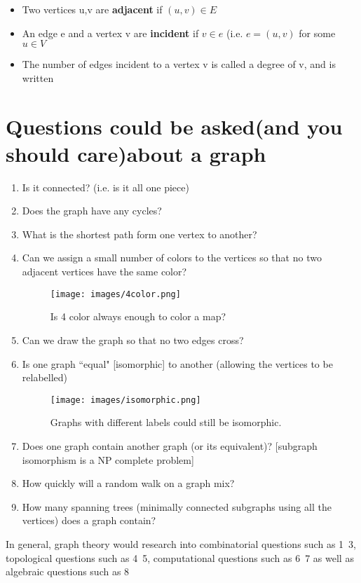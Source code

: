 \documentclass{article}
\theoremstyle{definition}
\theoremstyle{remark}
\begin{document}
\begin{itemize}
    \item Two vertices u,v are \textbf{adjacent} if $(u,v) \in E$
    \item An edge e and a vertex v are \textbf{incident} if $v \in e$ (i.e. $e = (u,v)$ for some $u \in V$
    \item The number of edges incident to a vertex v is called a degree of v, and is written 
\end{itemize}

 
 \section{Questions could be asked(and you should care)about a graph}
 \begin{enumerate}
  \item Is it connected? (i.e. is it all one piece)
  \item Does the graph have any cycles?
  \item What is the shortest path form one vertex to another?
  \item Can we assign a small number of colors to the vertices so that no two adjacent vertices have the same color?
  \begin{figure}[h]
    \centering
    \texttt{[image: images/4color.png]}
    \caption{Is 4 color always enough to color a map?}
    \label{fig:4color}
    \end{figure}
  \item Can we draw the graph so that no two edges cross?
  \item Is one graph ``equal" [isomorphic] to another (allowing the vertices to be relabelled)
  \begin{figure}[h]
    \centering
    \texttt{[image: images/isomorphic.png]}
    \caption{Graphs with different labels could still be isomorphic.}
    \label{fig:isomorphic}
    \end{figure}
  \item Does one graph contain another graph (or its equivalent)? [subgraph isomorphism is a NP complete problem]
  \item How quickly will a random walk on a graph mix?
  \item How many spanning trees (minimally connected subgraphs using all the vertices) does a graph contain?
\end{enumerate}

In general, graph theory would research into combinatorial questions such as 1~3, topological questions such as 4~5, computational questions such as 6~7 as well as algebraic questions such as 8
\end{document}
